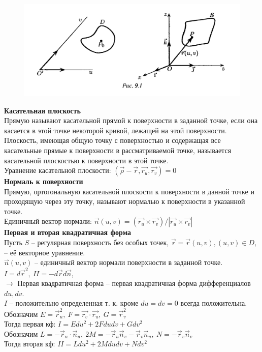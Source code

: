 \documentclass{report}
\begin{document}
\begin{figure}[ht!]
\centering
\includegraphics[width=120mm]{curve8.png}
\end{figure}

\newpage
\noindent
\textbf{Касательная плоскость}\\
Прямую называют касательной прямой к поверхности в заданной точке, если она касается
в этой точке некоторой кривой, лежащей на этой поверхности.\\
Плоскость, имеющая общую точку с поверхностью и содержащая все касательные прямые к
поверхности в рассматриваемой точке, называется касательной плоскостью к
поверхности в этой точке.\\
Уравнение касательной плоскости: 
$(\overrightarrow{\rho} - \overrightarrow{r}, \overrightarrow{r_u}, \overrightarrow{r_v}) = 0$\\

\noindent
\textbf{Нормаль к поверхности}\\
Прямую, ортогональную касательной плоскости к поверхности в данной точке и проходящую через
эту точку, называют нормалью к поверхности в указанной точке.\\
Единичный вектор нормали: $\overrightarrow{n}(u, v) = (\overrightarrow{r_u} \times
\overrightarrow{r_v})/|\overrightarrow{r_u} \times \overrightarrow{r_v}|$\\

\noindent
\textbf{Первая и вторая квадратичная форма}\\
Пусть $S$ -- регулярная поверхность без особых точек, $\overrightarrow{r} = 
\overrightarrow{r}(u, v), (u, v) \in D$, -- её векторное уравнение.\\
$\overrightarrow{n}(u, v)$ -- единичный вектор нормали поверхности в заданной точке.\\
$I = d\overrightarrow{r}^2,\ II = - d\overrightarrow{r} d\overrightarrow{n}$,\\
$\to$ Первая квадратичная форма -- первая квадратичная форма дифференциалов $du, dv$.\\
$I$ -- положительно определенная т. к. кроме $du = dv = 0$ всегда положительна.\\
Обозначим $E = \overrightarrow{r}_u^2,\ F = \overrightarrow{r_v} \cdot \overrightarrow{r_u},\
G = \overrightarrow{r}_v^2$\\
Тогда первая кф: $I = E du^2 + 2F du dv + G dv^2$\\
Обозначим $L = -\overrightarrow{r}_u \cdot \overrightarrow{n}_u,\ 2M = -\overrightarrow{r}_u
\overrightarrow{n}_v - \overrightarrow{r}_v \overrightarrow{n}_u,\ N = -\overrightarrow{r}_v
\overrightarrow{n}_v$\\
Тогда вторая кф: $II = L du^2 + 2M du dv + N dv^2$\\
\end{document}
